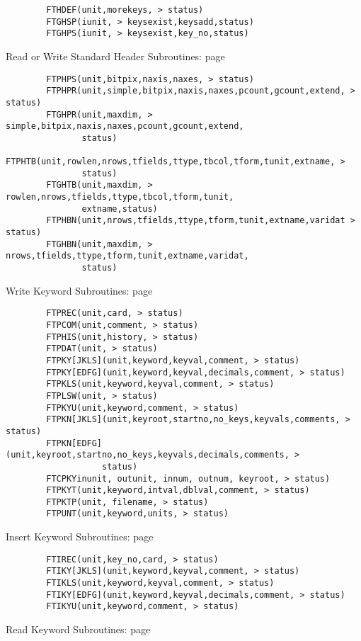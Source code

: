 \documentclass[11pt]{book}
\begin{document}
\begin{verbatim}
        FTHDEF(unit,morekeys, > status)
        FTGHSP(iunit, > keysexist,keysadd,status)
        FTGHPS(iunit, > keysexist,key_no,status)
\end{verbatim}
 Read or Write Standard Header Subroutines: page~\pageref{FTPHPR}

\begin{verbatim}
        FTPHPS(unit,bitpix,naxis,naxes, > status)
        FTPHPR(unit,simple,bitpix,naxis,naxes,pcount,gcount,extend, > status)
        FTGHPR(unit,maxdim, > simple,bitpix,naxis,naxes,pcount,gcount,extend,
               status)
        FTPHTB(unit,rowlen,nrows,tfields,ttype,tbcol,tform,tunit,extname, >
               status)
        FTGHTB(unit,maxdim, > rowlen,nrows,tfields,ttype,tbcol,tform,tunit,
               extname,status)
        FTPHBN(unit,nrows,tfields,ttype,tform,tunit,extname,varidat > status)
        FTGHBN(unit,maxdim, > nrows,tfields,ttype,tform,tunit,extname,varidat,
               status)
\end{verbatim}
 Write Keyword Subroutines: page~\pageref{FTPREC}

\begin{verbatim}
        FTPREC(unit,card, > status)
        FTPCOM(unit,comment, > status)
        FTPHIS(unit,history, > status)
        FTPDAT(unit, > status)
        FTPKY[JKLS](unit,keyword,keyval,comment, > status)
        FTPKY[EDFG](unit,keyword,keyval,decimals,comment, > status)
        FTPKLS(unit,keyword,keyval,comment, > status)
        FTPLSW(unit, > status)
        FTPKYU(unit,keyword,comment, > status)
        FTPKN[JKLS](unit,keyroot,startno,no_keys,keyvals,comments, > status)
        FTPKN[EDFG](unit,keyroot,startno,no_keys,keyvals,decimals,comments, >
                   status)
        FTCPKYinunit, outunit, innum, outnum, keyroot, > status)
        FTPKYT(unit,keyword,intval,dblval,comment, > status)
        FTPKTP(unit, filename, > status)
        FTPUNT(unit,keyword,units, > status)
\end{verbatim}
 Insert Keyword Subroutines: page~\pageref{FTIREC}

\begin{verbatim}
        FTIREC(unit,key_no,card, > status)
        FTIKY[JKLS](unit,keyword,keyval,comment, > status)
        FTIKLS(unit,keyword,keyval,comment, > status)
        FTIKY[EDFG](unit,keyword,keyval,decimals,comment, > status)
        FTIKYU(unit,keyword,comment, > status)
\end{verbatim}
 Read Keyword Subroutines: page~\pageref{FTGREC}
\end{document}
